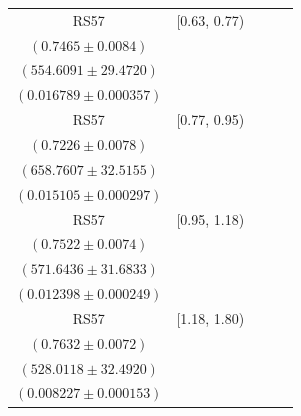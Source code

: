 {\begin{longtable}{|c|c|c|c|c|}
RS57 & [0.63, 0.77) & \begin{tabular}{@{}c@{}}$0.7401 \pm 0.0085$ \\ $(0.7465 \pm 0.0084)$\end{tabular} & \begin{tabular}{@{}c@{}}$559.3894 \pm 29.7260$ \\ $(554.6091 \pm 29.4720)$\end{tabular} & \begin{tabular}{@{}c@{}}$0.013498 \pm 0.000600$ \\ $(0.016789 \pm 0.000357)$\end{tabular} \\ \hline
RS57 & [0.77, 0.95) & \begin{tabular}{@{}c@{}}$0.7200 \pm 0.0083$ \\ $(0.7226 \pm 0.0078)$\end{tabular} & \begin{tabular}{@{}c@{}}$661.1379 \pm 32.6328$ \\ $(658.7607 \pm 32.5155)$\end{tabular} & \begin{tabular}{@{}c@{}}$0.013773 \pm 0.000532$ \\ $(0.015105 \pm 0.000297)$\end{tabular} \\ \hline
RS57 & [0.95, 1.18) & \begin{tabular}{@{}c@{}}$0.7131 \pm 0.0092$ \\ $(0.7522 \pm 0.0074)$\end{tabular} & \begin{tabular}{@{}c@{}}$602.9886 \pm 33.4206$ \\ $(571.6436 \pm 31.6833)$\end{tabular} & \begin{tabular}{@{}c@{}}$0.011832 \pm 0.000456$ \\ $(0.012398 \pm 0.000249)$\end{tabular} \\ \hline
RS57 & [1.18, 1.80) & \begin{tabular}{@{}c@{}}$0.6848 \pm 0.0104$ \\ $(0.7632 \pm 0.0072)$\end{tabular} & \begin{tabular}{@{}c@{}}$588.5218 \pm 36.2155$ \\ $(528.0118 \pm 32.4920)$\end{tabular} & \begin{tabular}{@{}c@{}}$0.007889 \pm 0.000280$ \\ $(0.008227 \pm 0.000153)$\end{tabular} \\ \hline

\end{longtable}}
